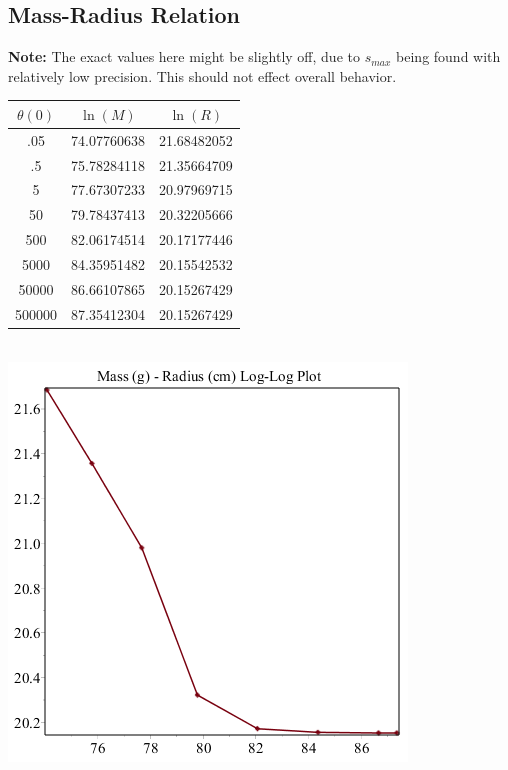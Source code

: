 \documentclass[11pt]{article} %
\begin{document}
\subsection*{Mass-Radius Relation}
\textbf{Note:} The exact values here might be slightly off, due to $s_{max}$ being found with relatively low precision. This should not effect overall behavior.\\
\begin{tabular}{| c | c c |}
\hline
$\theta(0)$ & $\ln(M)$ & $\ln(R)$ \\
\hline
.05 & 74.07760638 & 21.68482052\\
.5 &75.78284118 & 21.35664709\\
5 &77.67307233 &20.97969715 \\
50 &79.78437413 & 20.32205666\\
500 & 82.06174514 & 20.17177446\\
5000 & 84.35951482& 20.15542532 \\
50000 &86.66107865 & 20.15267429 \\
500000 & 87.35412304& 20.15267429\\
\hline
\end{tabular}\\
\includegraphics{plots/wdmassrad.png}
\end{document}
